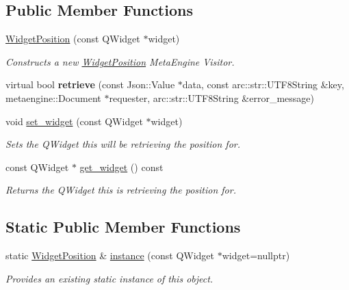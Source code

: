 \subsection*{Public Member Functions}
\begin{DoxyCompactItemize}
\item 
\hyperlink{classmeta__qt_1_1_widget_position_af6b012ea736567d503c95368db37fa1e}{Widget\+Position} (const Q\+Widget $\ast$widget)
\begin{DoxyCompactList}\small\item\em Constructs a new \hyperlink{classmeta__qt_1_1_widget_position}{Widget\+Position} Meta\+Engine Visitor. \end{DoxyCompactList}\item 
\hypertarget{classmeta__qt_1_1_widget_position_a6a0684f0d2d7166a5024f55724ddb9f2}{}virtual bool {\bfseries retrieve} (const Json\+::\+Value $\ast$data, const arc\+::str\+::\+U\+T\+F8\+String \&key, metaengine\+::\+Document $\ast$requester, arc\+::str\+::\+U\+T\+F8\+String \&error\+\_\+message)\label{classmeta__qt_1_1_widget_position_a6a0684f0d2d7166a5024f55724ddb9f2}

\item 
\hypertarget{classmeta__qt_1_1_widget_position_a0e65b85095e3730f3b592fa9ef61ac92}{}void \hyperlink{classmeta__qt_1_1_widget_position_a0e65b85095e3730f3b592fa9ef61ac92}{set\+\_\+widget} (const Q\+Widget $\ast$widget)\label{classmeta__qt_1_1_widget_position_a0e65b85095e3730f3b592fa9ef61ac92}

\begin{DoxyCompactList}\small\item\em Sets the Q\+Widget this will be retrieving the position for. \end{DoxyCompactList}\item 
\hypertarget{classmeta__qt_1_1_widget_position_a66b98f4f2d9037cc0b8494f2f39fd20d}{}const Q\+Widget $\ast$ \hyperlink{classmeta__qt_1_1_widget_position_a66b98f4f2d9037cc0b8494f2f39fd20d}{get\+\_\+widget} () const \label{classmeta__qt_1_1_widget_position_a66b98f4f2d9037cc0b8494f2f39fd20d}

\begin{DoxyCompactList}\small\item\em Returns the Q\+Widget this is retrieving the position for. \end{DoxyCompactList}\end{DoxyCompactItemize}
\subsection*{Static Public Member Functions}
\begin{DoxyCompactItemize}
\item 
static \hyperlink{classmeta__qt_1_1_widget_position}{Widget\+Position} \& \hyperlink{classmeta__qt_1_1_widget_position_ada9a8a92258884fc06bd0482b29e13fa}{instance} (const Q\+Widget $\ast$widget=nullptr)
\begin{DoxyCompactList}\small\item\em Provides an existing static instance of this object. \end{DoxyCompactList}\end{DoxyCompactItemize}


